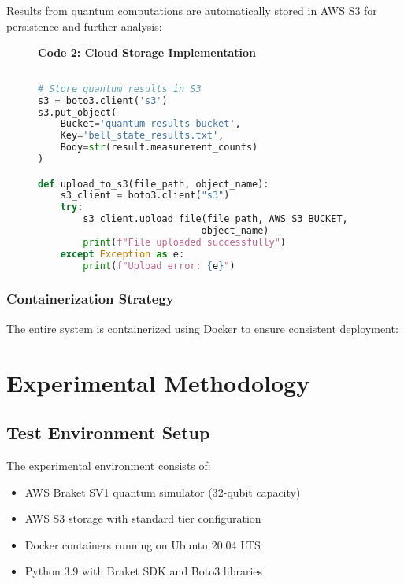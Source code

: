 \documentclass[conference]{IEEEtran}
\begin{document}
Results from quantum computations are automatically stored in AWS S3 for persistence and further analysis:

\begin{figure}[h]
\centering
\setlength{\fboxsep}{8pt}
\textbf{Code 2: Cloud Storage Implementation}
\vspace{3pt}
\hrule
\vspace{3pt}
\begin{lstlisting}[language=Python, basicstyle=\ttfamily\scriptsize, breaklines=true]
# Store quantum results in S3
s3 = boto3.client('s3')
s3.put_object(
    Bucket='quantum-results-bucket',
    Key='bell_state_results.txt',
    Body=str(result.measurement_counts)
)

def upload_to_s3(file_path, object_name):
    s3_client = boto3.client("s3")
    try:
        s3_client.upload_file(file_path, AWS_S3_BUCKET, 
                             object_name)
        print(f"File uploaded successfully")
    except Exception as e:
        print(f"Upload error: {e}")
\end{lstlisting}
\end{figure}

\subsubsection{Containerization Strategy}

The entire system is containerized using Docker to ensure consistent deployment:



\section{Experimental Methodology}

\subsection{Test Environment Setup}

The experimental environment consists of:
\begin{itemize}
    \item AWS Braket SV1 quantum simulator (32-qubit capacity)
    \item AWS S3 storage with standard tier configuration
    \item Docker containers running on Ubuntu 20.04 LTS
    \item Python 3.9 with Braket SDK and Boto3 libraries
\end{itemize}
\end{document}
